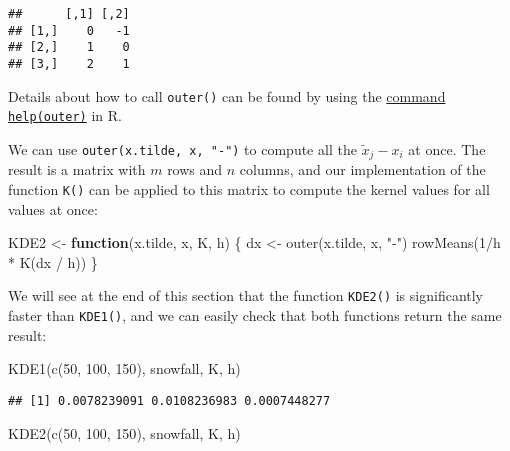 \documentclass[
  a4paper,
]{article}
\newenvironment{Shaded}{\begin{snugshade}}{\end{snugshade}}
\newcommand{\ControlFlowTok}[1]{\textcolor[rgb]{0.13,0.29,0.53}{\textbf{#1}}}
\newcommand{\DecValTok}[1]{\textcolor[rgb]{0.00,0.00,0.81}{#1}}
\newcommand{\FunctionTok}[1]{\textcolor[rgb]{0.00,0.00,0.00}{#1}}
\newcommand{\NormalTok}[1]{#1}
\newcommand{\OtherTok}[1]{\textcolor[rgb]{0.56,0.35,0.01}{#1}}
\newcommand{\SpecialCharTok}[1]{\textcolor[rgb]{0.00,0.00,0.00}{#1}}
\newcommand{\StringTok}[1]{\textcolor[rgb]{0.31,0.60,0.02}{#1}}
\theoremstyle{definition}
\theoremstyle{definition}
\theoremstyle{definition}
\theoremstyle{definition}
\theoremstyle{remark}
\begin{document}
\begin{verbatim}
##      [,1] [,2]
## [1,]    0   -1
## [2,]    1    0
## [3,]    2    1
\end{verbatim}

Details about how to call \texttt{outer()} can be found by using the
\href{https://rdrr.io/r/base/outer.html}{command \texttt{help(outer)}} in R.

We can use \texttt{outer(x.tilde,\ x,\ "-")} to compute all the \(\tilde x_j - x_i\)
at once. The result is a matrix with \(m\) rows and \(n\) columns, and
our implementation of the function \texttt{K()} can be applied to this matrix
to compute the kernel values for all values at once:

\begin{Shaded}
\begin{Highlighting}[]
\NormalTok{KDE2 }\OtherTok{\textless{}{-}} \ControlFlowTok{function}\NormalTok{(x.tilde, x, K, h) \{}
\NormalTok{  dx }\OtherTok{\textless{}{-}} \FunctionTok{outer}\NormalTok{(x.tilde, x, }\StringTok{"{-}"}\NormalTok{)}
  \FunctionTok{rowMeans}\NormalTok{(}\DecValTok{1}\SpecialCharTok{/}\NormalTok{h }\SpecialCharTok{*} \FunctionTok{K}\NormalTok{(dx }\SpecialCharTok{/}\NormalTok{ h))}
\NormalTok{\}}
\end{Highlighting}
\end{Shaded}

We will see at the end of this section that the function \texttt{KDE2()} is
significantly faster than \texttt{KDE1()}, and we can easily check that both
functions return the same result:

\begin{Shaded}
\begin{Highlighting}[]
\FunctionTok{KDE1}\NormalTok{(}\FunctionTok{c}\NormalTok{(}\DecValTok{50}\NormalTok{, }\DecValTok{100}\NormalTok{, }\DecValTok{150}\NormalTok{), snowfall, K, h)}
\end{Highlighting}
\end{Shaded}

\begin{verbatim}
## [1] 0.0078239091 0.0108236983 0.0007448277
\end{verbatim}

\begin{Shaded}
\begin{Highlighting}[]
\FunctionTok{KDE2}\NormalTok{(}\FunctionTok{c}\NormalTok{(}\DecValTok{50}\NormalTok{, }\DecValTok{100}\NormalTok{, }\DecValTok{150}\NormalTok{), snowfall, K, h)}
\end{Highlighting}
\end{Shaded}
\end{document}
